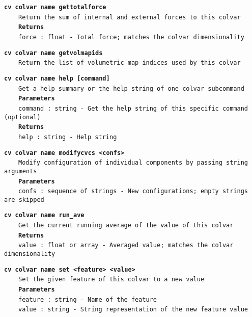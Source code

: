 \begin{mdexampleinput}{}
\texttt{\textbf{cv colvar name gettotalforce}}
\\
\-~~~~\texttt{Return the sum of internal and external forces to this colvar}
\\
\-~~~~\texttt{\textbf{Returns}}
\\
\-~~~~\texttt{force : float - Total force; matches the colvar dimensionality}
\end{mdexampleinput}
\begin{mdexampleinput}{}
\texttt{\textbf{cv colvar name getvolmapids}}
\\
\-~~~~\texttt{Return the list of volumetric map indices used by this colvar}
\end{mdexampleinput}
\begin{mdexampleinput}{}
\texttt{\textbf{cv colvar name help [command]}}
\\
\-~~~~\texttt{Get a help summary or the help string of one colvar subcommand}
\\
\-~~~~\texttt{\textbf{Parameters}}
\\
\-~~~~\texttt{command : string - Get the help string of this specific command (optional)}
\\
\-~~~~\texttt{\textbf{Returns}}
\\
\-~~~~\texttt{help : string - Help string}
\end{mdexampleinput}
\begin{mdexampleinput}{}
\texttt{\textbf{cv colvar name modifycvcs <confs>}}
\\
\-~~~~\texttt{Modify configuration of individual components by passing string arguments}
\\
\-~~~~\texttt{\textbf{Parameters}}
\\
\-~~~~\texttt{confs : sequence of strings - New configurations; empty strings are skipped}
\end{mdexampleinput}
\begin{mdexampleinput}{}
\texttt{\textbf{cv colvar name run\_ave}}
\\
\-~~~~\texttt{Get the current running average of the value of this colvar}
\\
\-~~~~\texttt{\textbf{Returns}}
\\
\-~~~~\texttt{value : float or array - Averaged value; matches the colvar dimensionality}
\end{mdexampleinput}
\begin{mdexampleinput}{}
\texttt{\textbf{cv colvar name set <feature> <value>}}
\\
\-~~~~\texttt{Set the given feature of this colvar to a new value}
\\
\-~~~~\texttt{\textbf{Parameters}}
\\
\-~~~~\texttt{feature : string - Name of the feature}
\\
\-~~~~\texttt{value : string - String representation of the new feature value}
\end{mdexampleinput}
